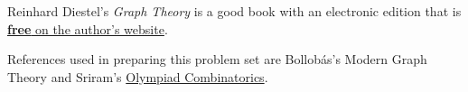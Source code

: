 \documentclass[11pt,paper=letter]{scrartcl}
\begin{document}
Reinhard Diestel's \emph{Graph Theory} is a good book with an electronic edition that is \href{http://www.esi2.us.es/~mbilbao/pdffiles/DiestelGT.pdf}{\textbf{free} on the author's website}. 

References used in preparing this problem set are Bollob\'as's Modern Graph Theory and Sriram's \href{https://artofproblemsolving.com/community/c6h601134}{Olympiad Combinatorics}.






\end{document}
